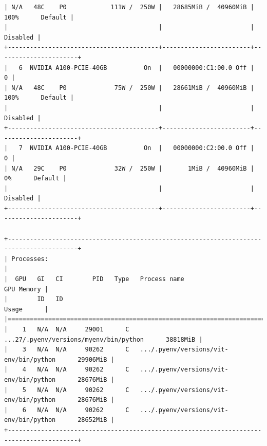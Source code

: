 \begin{verbatim}
| N/A   48C    P0            111W /  250W |   28685MiB /  40960MiB |    100%      Default |
|                                         |                        |             Disabled |
+-----------------------------------------+------------------------+----------------------+
|   6  NVIDIA A100-PCIE-40GB          On  |   00000000:C1:00.0 Off |                    0 |
| N/A   48C    P0             75W /  250W |   28661MiB /  40960MiB |    100%      Default |
|                                         |                        |             Disabled |
+-----------------------------------------+------------------------+----------------------+
|   7  NVIDIA A100-PCIE-40GB          On  |   00000000:C2:00.0 Off |                    0 |
| N/A   29C    P0             32W /  250W |       1MiB /  40960MiB |      0%      Default |
|                                         |                        |             Disabled |
+-----------------------------------------+------------------------+----------------------+
                                                                                         
+-----------------------------------------------------------------------------------------+
| Processes:                                                                              |
|  GPU   GI   CI        PID   Type   Process name                              GPU Memory |
|        ID   ID                                                               Usage      |
|=========================================================================================|
|    1   N/A  N/A     29001      C   ...27/.pyenv/versions/myenv/bin/python      38818MiB |
|    3   N/A  N/A     90262      C   .../.pyenv/versions/vit-env/bin/python      29906MiB |
|    4   N/A  N/A     90262      C   .../.pyenv/versions/vit-env/bin/python      28676MiB |
|    5   N/A  N/A     90262      C   .../.pyenv/versions/vit-env/bin/python      28676MiB |
|    6   N/A  N/A     90262      C   .../.pyenv/versions/vit-env/bin/python      28652MiB |
+-----------------------------------------------------------------------------------------+


\end{verbatim}
